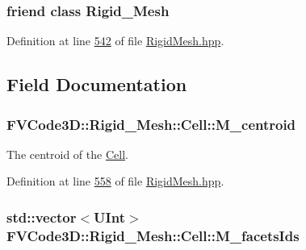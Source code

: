 \subsubsection[{\texorpdfstring{Rigid\+\_\+\+Mesh}{Rigid_Mesh}}]{\setlength{\rightskip}{0pt plus 5cm}friend class {\bf Rigid\+\_\+\+Mesh}\hspace{0.3cm}{\ttfamily [friend]}}\hypertarget{classFVCode3D_1_1Rigid__Mesh_1_1Cell_a43983e56a64f3bc6fc936f03c4b170bb}{}\label{classFVCode3D_1_1Rigid__Mesh_1_1Cell_a43983e56a64f3bc6fc936f03c4b170bb}


Definition at line \hyperlink{RigidMesh_8hpp_source_l00542}{542} of file \hyperlink{RigidMesh_8hpp_source}{Rigid\+Mesh.\+hpp}.



\subsection{Field Documentation}
\subsubsection[{\texorpdfstring{M\+\_\+centroid}{M_centroid}}]{ F\+V\+Code3\+D\+::\+Rigid\+\_\+\+Mesh\+::\+Cell\+::\+M\+\_\+centroid\hspace{0.3cm}{\ttfamily [protected]}}\hypertarget{classFVCode3D_1_1Rigid__Mesh_1_1Cell_a5c7626d4a6faec9e43429166dcad110b}{}\label{classFVCode3D_1_1Rigid__Mesh_1_1Cell_a5c7626d4a6faec9e43429166dcad110b}


The centroid of the \hyperlink{classFVCode3D_1_1Rigid__Mesh_1_1Cell}{Cell}. 



Definition at line \hyperlink{RigidMesh_8hpp_source_l00558}{558} of file \hyperlink{RigidMesh_8hpp_source}{Rigid\+Mesh.\+hpp}.

\subsubsection[{\texorpdfstring{M\+\_\+facets\+Ids}{M_facetsIds}}]{\setlength{\rightskip}{0pt plus 5cm}std\+::vector$<${\bf U\+Int}$>$ F\+V\+Code3\+D\+::\+Rigid\+\_\+\+Mesh\+::\+Cell\+::\+M\+\_\+facets\+Ids\hspace{0.3cm}{\ttfamily [protected]}}\hypertarget{classFVCode3D_1_1Rigid__Mesh_1_1Cell_a9484ef98b77a1e7588b29baac5cf27db}{}\label{classFVCode3D_1_1Rigid__Mesh_1_1Cell_a9484ef98b77a1e7588b29baac5cf27db}


